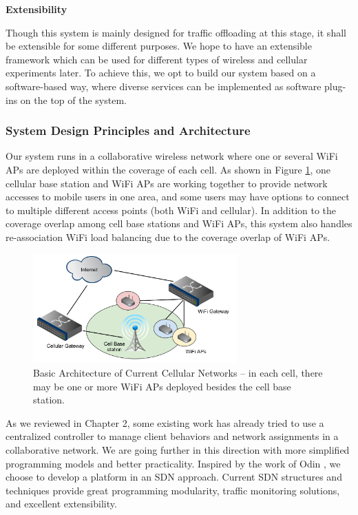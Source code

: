 \documentclass[english]{tktltiki}
\begin{document}
\vspace{1mm}

\textbf{Extensibility}

\vspace{1mm}

Though this system is mainly designed for traffic offloading at this stage, it shall be extensible for some different purposes. We hope to have an extensible framework which can be used for different types of wireless and cellular experiments later. To achieve this, we opt to build our system based on a software-based way, where diverse services can be implemented as software plug-ins on the top of the system.


\subsubsection{System Design Principles and Architecture}

Our system runs in a collaborative wireless network where one or several WiFi APs are deployed within the coverage of each cell. As shown in Figure \ref{fig:networks}, one cellular base station and WiFi APs are working together to provide network accesses to mobile users in one area, and some users may have options to connect to multiple different access points (both WiFi and cellular). In addition to the coverage overlap among cell base stations and WiFi APs, this system also handles re-association WiFi load balancing due to the coverage overlap of WiFi APs.

\begin{figure}[htbp]
  \centering
  \includegraphics[width=0.7\textwidth]{images/networks.png}
  \caption{Basic Architecture of Current Cellular Networks -- in each cell, there may be one or more WiFi APs deployed besides the cell base station.}
  \label{fig:networks}
\end{figure}

As we reviewed in Chapter 2, some existing work has already tried to use a centralized controller to manage client behaviors and network assignments in a collaborative network. We are going further in this direction with more simplified programming models and better practicality. Inspired by the work of Odin \cite{sszm+12}, we choose to develop a platform in an SDN approach. Current SDN structures and techniques provide great programming modularity, traffic monitoring solutions, and excellent extensibility. 
\end{document}
